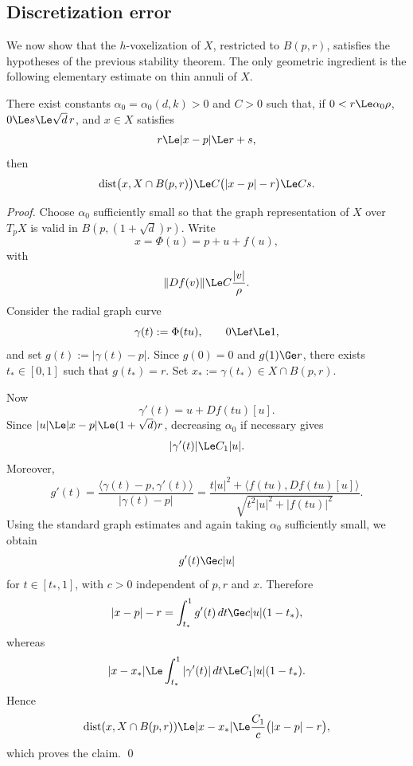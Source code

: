 \subsection{Discretization error}

We now show that the $h$-voxelization of $X$, restricted to
$B(p,r)$, satisfies the hypotheses of the previous stability theorem.
The only geometric ingredient is the following elementary estimate on
thin annuli of $X$.

\begin{lemma}
\label{lem:radial-annulus}
There exist constants $\alpha_0=\alpha_0(d,k)>0$ and $C>0$ such that,
if $0<r\Le\alpha_0\rho$, $0\Le s\Le\sqrt d\,r$, and
$x\in X$ satisfies
\[
 r\Le |x-p|\Le r+s,
\]
then
\begin{equation}
\label{eq:radial-annulus}
 \operatorname{dist}\bigl(x,X\cap B(p,r)\bigr)
 \Le C\bigl(|x-p|-r\bigr)
 \Le Cs.
\end{equation}
\end{lemma}
\begin{proof}
Choose $\alpha_0$ sufficiently small so that the graph representation
of $X$ over $T_pX$ is valid in $B(p,(1+\sqrt d)r)$. Write
\[
 x=\Phi(u)=p+u+f(u),
\]
with
\[
 \|Df(v)\|\Le C\frac{|v|}{\rho}.
\]
Consider the radial graph curve
\[
 \gamma(t):=\Phi(tu),\qquad 0\Le t\Le1,
\]
and set $g(t):=|\gamma(t)-p|$. Since $g(0)=0$ and $g(1)\Ge r$, there
exists $t_*\in[0,1]$ such that $g(t_*)=r$. Set
$x_*:=\gamma(t_*)\in X\cap B(p,r)$.

Now
\[
 \gamma'(t)=u+Df(tu)[u].
\]
Since $|u|\Le|x-p|\Le(1+\sqrt d)r$, decreasing $\alpha_0$ if
necessary gives
\[
 |\gamma'(t)|\Le C_1|u|.
\]
Moreover,
\[
 g'(t)
 =\frac{\langle\gamma(t)-p,\gamma'(t)\rangle}
 {|\gamma(t)-p|}
 =\frac{t|u|^2+\langle f(tu),Df(tu)[u]\rangle}
 {\sqrt{t^2|u|^2+|f(tu)|^2}}.
\]
Using the standard graph estimates and again taking $\alpha_0$
sufficiently small, we obtain
\[
 g'(t)\Ge c|u|
\]
for $t\in[t_*,1]$, with $c>0$ independent of $p,r$ and $x$.
Therefore
\[
 |x-p|-r
 =\int_{t_*}^1g'(t)\,dt
 \Ge c|u|(1-t_*),
\]
whereas
\[
 |x-x_*|
 \Le\int_{t_*}^1|\gamma'(t)|\,dt
 \Le C_1|u|(1-t_*).
\]
Hence
\[
 \operatorname{dist}(x,X\cap B(p,r))
 \Le |x-x_*|
 \Le \frac{C_1}{c}\bigl(|x-p|-r\bigr),
\]
which proves the claim.
\qed
\end{proof}

